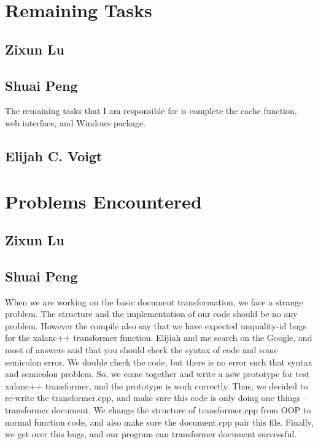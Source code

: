 \section{Remaining Tasks}

\subsection{Zixun Lu}

\subsection{Shuai Peng}
The remaining tasks that I am responsible for is complete the cache function, web interface, and Windows package.

\subsection{Elijah C. Voigt}

\section{Problems Encountered}

\subsection{Zixun Lu}

\subsection{Shuai Peng}
When we are working on the basic document transformation, we face a strange problem.
The structure and the implementation of our code should be no any problem.
However the compile also say that we have expected unquality-id bugs for the xalanc++ transformer function.
Elijiah and me search on the Google, and most of answers said that you should check the syntax of code and some semicolon error.
We double check the code, but there is no error such that syntax and semicolon problem.
So, we come together and write a new prototype for test xalanc++ transformer, and the prototype is work correctly.
Thus, we decided to re-write the transformer.cpp, and make sure this code is only doing one things -- transformer document.
We change the structure of transformer.cpp from OOP to normal function code, and also make sure the document.cpp pair this file.
Finally, we get over this bugs, and our program can transformer document successful. 

